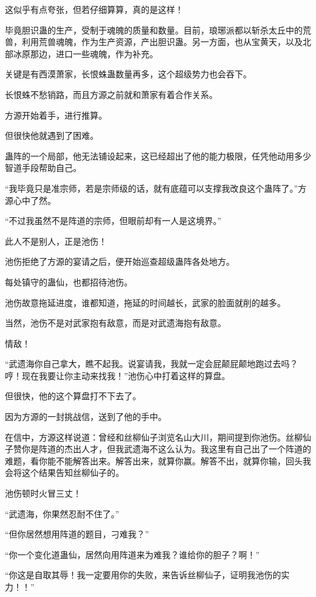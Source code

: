 \begin{this_body}
这似乎有点夸张，但若仔细算算，真的是这样！

毕竟胆识蛊的生产，受制于魂魄的质量和数量。目前，琅琊派都以斩杀太丘中的荒兽，利用荒兽魂魄，作为生产资源，产出胆识蛊。另一方面，也从宝黄天，以及北部冰原那边，进口一些魂魄，作为补充。

关键是有西漠萧家，长恨蛛蛊数量再多，这个超级势力也会吞下。

长恨蛛不愁销路，而且方源之前就和萧家有着合作关系。

方源开始着手，进行推算。

但很快他就遇到了困难。

蛊阵的一个局部，他无法铺设起来，这已经超出了他的能力极限，任凭他动用多少智道手段帮助自己。

“我毕竟只是准宗师，若是宗师级的话，就有底蕴可以支撑我改良这个蛊阵了。”方源心中了然。

“不过我虽然不是阵道的宗师，但眼前却有一人是这境界。”

此人不是别人，正是池伤！

池伤拒绝了方源的宴请之后，便开始巡查超级蛊阵各处地方。

每处镇守的蛊仙，也都招待池伤。

池伤故意拖延进度，谁都知道，拖延的时间越长，武家的脸面就削的越多。

当然，池伤不是对武家抱有敌意，而是对武遗海抱有敌意。

情敌！

“武遗海你自己拿大，瞧不起我。说宴请我，我就一定会屁颠屁颠地跑过去吗？哼！现在我要让你主动来找我！”池伤心中打着这样的算盘。

但很快，他的这个算盘打不下去了。

因为方源的一封挑战信，送到了他的手中。

在信中，方源这样说道：曾经和丝柳仙子浏览名山大川，期间提到你池伤。丝柳仙子赞你是阵道的杰出人才，但我武遗海不这么认为。我这里有自己出了一个阵道的难题，看你能不能解答出来。解答出来，就算你赢。解答不出，就算你输，回头我会将这个结果告知丝柳仙子的。

池伤顿时火冒三丈！

“武遗海，你果然忍耐不住了。”

“但你居然想用阵道的题目，刁难我？”

“你一个变化道蛊仙，居然向用阵道来为难我？谁给你的胆子？啊！”

“你这是自取其辱！我一定要用你的失败，来告诉丝柳仙子，证明我池伤的实力！！”

\end{this_body}

